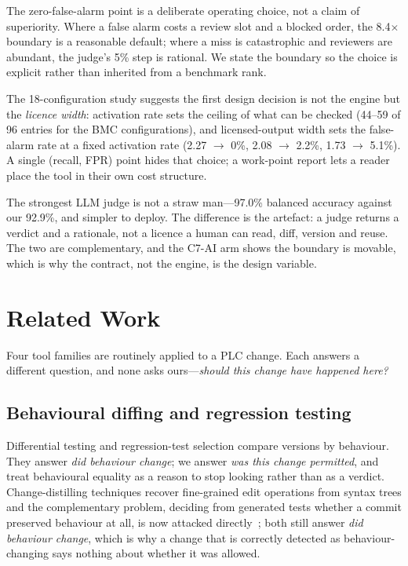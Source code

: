 \documentclass[acmsmall,screen,review,anonymous]{acmart}
\begin{document}
The zero-false-alarm point is a deliberate operating choice, not a claim of superiority. Where a false alarm costs a review slot and a blocked order, the 8.4$\times$ boundary is a reasonable default; where a miss is catastrophic and reviewers are abundant, the judge's 5\% step is rational. We state the boundary so the choice is explicit rather than inherited from a benchmark rank.

The 18-configuration study suggests the first design decision is not the engine but the \emph{licence width}: activation rate sets the ceiling of what can be checked (44--59 of 96 entries for the BMC configurations), and licensed-output width sets the false-alarm rate at a fixed activation rate (2.27 $\to$ 0\%, 2.08 $\to$ 2.2\%, 1.73 $\to$ 5.1\%). A single (recall, FPR) point hides that choice; a work-point report lets a reader place the tool in their own cost structure.

The strongest LLM judge is not a straw man---97.0\% balanced accuracy against our 92.9\%, and simpler to deploy. The difference is the artefact: a judge returns a verdict and a rationale, not a licence a human can read, diff, version and reuse. The two are complementary, and the C7-AI arm shows the boundary is movable, which is why the contract, not the engine, is the design variable.

\section{Related Work}
\label{sec:related}

Four tool families are routinely applied to a PLC change. Each answers a different question, and none asks ours---\emph{should this change have happened here?}

\subsection{Behavioural diffing and regression testing}

Differential testing and regression-test selection compare versions by behaviour. They answer \emph{did behaviour change}; we answer \emph{was this change permitted}, and treat behavioural equality as a reason to stop looking rather than as a verdict. Change-distilling techniques recover fine-grained edit operations from syntax trees \citep{changedistiller} and the complementary problem, deciding from generated tests whether a commit preserved behaviour at all, is now attacked directly~\citep{semadiff}; both still answer \emph{did behaviour change}, which is why a change that is correctly detected as behaviour-changing says nothing about whether it was allowed.
\end{document}
